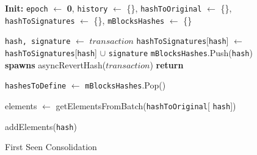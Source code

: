 \begin{figure}[t!]
  \begin{adjustbox}{minipage=[t]{\columnwidth}}
    \begin{algorithm}[H]
      \renewcommand{\thealgorithm}{ABCI Hashchain}         
      \caption{\small First Seen Consolidation}%
      \label{alg:abci-hash-first-seen}%
      \small
      \begin{algorithmic}[1]
            \State \textbf{Init:} \texttt{epoch} $\leftarrow$ \textbf{0}, \texttt{history} $\leftarrow$ \{\}, \texttt{hashToOriginal} $\leftarrow$ \{\}, \texttt{hashToSignatures} $\leftarrow$ \{\}, \texttt{mBlocksHashes} $\leftarrow$ \{\}
      
            \label{alg4:deliver_tx}
            		\State \texttt{hash, signature} $\leftarrow$ $transaction$
            		\State \texttt{hashToSignatures}[\texttt{hash}] $\leftarrow$ \texttt{hashToSignatures}[\texttt{hash}] $\cup$  \texttt{signature}
					\State \texttt{mBlocksHashes}.Push(\texttt{hash}) 
            		\EndIf
            			\State \textbf{spawns} asyncRevertHash($transaction$)
                	\EndIf
                \State \textbf{return}
            \EndFunction
            
            		\State \texttt{hashesToDefine} $\leftarrow$ \texttt{mBlocksHashes}.Pop()
            				
            						\State elements $\leftarrow$ getElementsFromBatch(\texttt{hashToOriginal}[ \texttt{hash}])
            		
            						\State addElements(\texttt{hash})
            					\EndIf
            				\Else
            				\EndIf
					\Else
            			\EndIf
            		\EndFor
            \EndFunction
            
        \end{algorithmic}
      \end{algorithm}
	\end{adjustbox}
  \end{figure}

